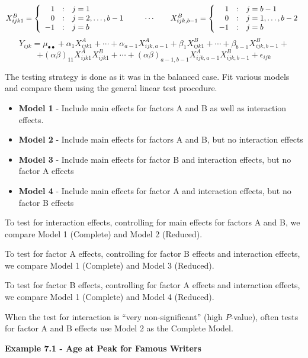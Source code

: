 \documentclass[
]{book}
\providecommand{\tightlist}{%
  \setlength{\itemsep}{0pt}\setlength{\parskip}{0pt}}
\begin{document}
\[
X_{ijk1}^B=\left\{ \begin{array}{r@{\quad:\quad}l} 
    1 & j=1 \\ 0 & j=2,\ldots,b-1\\ -1 & j=b 
    \end{array}  \right.
    \qquad \cdots \qquad
X_{ijk,b-1}^B=\left\{ \begin{array}{r@{\quad:\quad}l} 
    1 & j=b-1 \\ 0 & j=1,\ldots,b-2\\ -1 & j=b 
    \end{array}  \right.    
\] \[
Y_{ijk}=\mu_{\bullet\bullet} + \alpha_1X_{ijk1}^A + \cdots +\alpha_{a-1}X_{ijk,a-1}^A +
\beta_1X_{ijk1}^B + \cdots + \beta_{b-1}X_{ijk,b-1}^B + 
\] \[
+ (\alpha\beta)_{11}X_{ijk1}^AX_{ijk1}^B + \cdots +
(\alpha\beta)_{a-1,b-1}X_{ijk,a-1}^AX_{ijk,b-1}^B + \epsilon_{ijk}
\]

The testing strategy is done as it was in the balanced case. Fit various
models and compare them using the general linear test procedure.

\begin{itemize}
\tightlist
\item
  \textbf{Model 1} - Include main effects for factors A and B as well as
  interaction effects.
\item
  \textbf{Model 2} - Include main effects for factors A and B, but no
  interaction effects
\item
  \textbf{Model 3} - Include main effects for factor B and interaction
  effects, but no factor A effects
\item
  \textbf{Model 4} - Include main effects for factor A and interaction
  effects, but no factor B effects
\end{itemize}

To test for interaction effects, controlling for main effects for
factors A and B, we compare Model 1 (Complete) and Model 2 (Reduced).

To test for factor A effects, controlling for factor B effects and
interaction effects, we compare Model 1 (Complete) and Model 3
(Reduced).

To test for factor B effects, controlling for factor A effects and
interaction effects, we compare Model 1 (Complete) and Model 4
(Reduced).

When the test for interaction is ``very non-significant'' (high
\(P\)-value), often tests for factor A and B effects use Model 2 as the
Complete Model.

\textbf{Example 7.1 - Age at Peak for Famous Writers}
\end{document}
